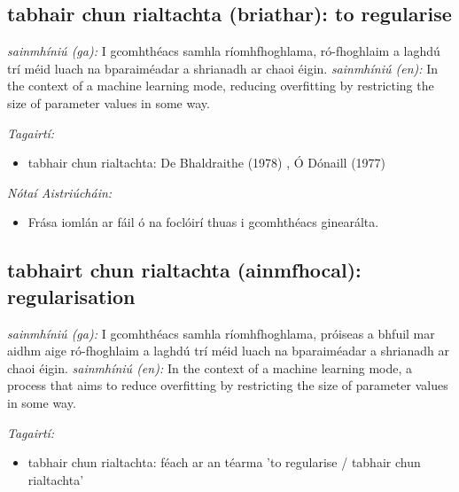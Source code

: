 \documentclass{article}
\begin{document}
\subsection*{tabhair chun rialtachta (briathar): to regularise} 
 \noindent \textit{sainmhíniú (ga):} I gcomhthéacs samhla ríomhfhoghlama, ró-fhoghlaim a laghdú trí méid luach na bparaiméadar a shrianadh ar chaoi éigin.
\newline\newline
 \noindent \textit{sainmhíniú (en):} In the context of a machine learning mode, reducing overfitting by restricting the size of parameter values in some way.
\newline

 \noindent \textit{Tagairtí:}
\begin{itemize}
	\item tabhair chun rialtachta: De Bhaldraithe (1978) \cite{de-bhaldraithe}, Ó Dónaill (1977) \cite{odonaill}
\end{itemize}

 \noindent \textit{Nótaí Aistriúcháin:}
\begin{itemize}
	\item Frása iomlán ar fáil ó na foclóirí thuas i gcomhthéacs ginearálta.
\end{itemize}


\subsection*{tabhairt chun rialtachta (ainmfhocal): regularisation} 
 \noindent \textit{sainmhíniú (ga):} I gcomhthéacs samhla ríomhfhoghlama, próiseas a bhfuil mar aidhm aige ró-fhoghlaim a laghdú trí méid luach na bparaiméadar a shrianadh ar chaoi éigin.
\newline\newline
 \noindent \textit{sainmhíniú (en):} In the context of a machine learning mode, a process that aims to reduce overfitting by restricting the size of parameter values in some way.
\newline

 \noindent \textit{Tagairtí:}
\begin{itemize}
	\item tabhair chun rialtachta: féach ar an téarma 'to regularise / tabhair chun rialtachta'
\end{itemize}
\end{document}

